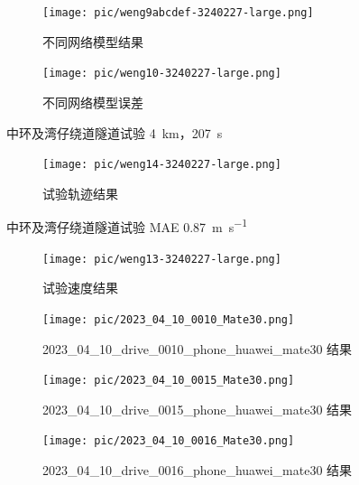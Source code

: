 \documentclass{beamer} %
\begin{document}
\begin{frame}
    \begin{figure}[htbp]
        \centering
        \texttt{[image: pic/weng9abcdef-3240227-large.png]}
        \caption{不同网络模型结果}
    \end{figure}    
\end{frame}

\begin{frame}
    \begin{figure}[htbp]
        \centering
        \texttt{[image: pic/weng10-3240227-large.png]}
        \caption{不同网络模型误差}
    \end{figure}    
\end{frame}

\begin{frame}{中环及湾仔绕道隧道试验}
    \qty{4}{\km}，\qty{207}{\s}
    \begin{figure}[htbp]
        \centering
        \texttt{[image: pic/weng14-3240227-large.png]}
        \caption{试验轨迹结果}
    \end{figure}    
\end{frame}

\begin{frame}{中环及湾仔绕道隧道试验}
    MAE \qty{0.87}{\m\per\s}
    \begin{figure}[htbp]
        \centering
        \texttt{[image: pic/weng13-3240227-large.png]}
        \caption{试验速度结果}
    \end{figure}    
\end{frame}

\begin{frame}
    \begin{figure}[htbp]
        \centering
        \texttt{[image: pic/2023\_04\_10\_0010\_Mate30.png]}
        \caption{2023\_04\_10\_drive\_0010\_phone\_huawei\_mate30 结果}
    \end{figure}
\end{frame}

\begin{frame}
    \begin{figure}[htbp]
        \centering
        \texttt{[image: pic/2023\_04\_10\_0015\_Mate30.png]}
        \caption{2023\_04\_10\_drive\_0015\_phone\_huawei\_mate30 结果}
    \end{figure}
\end{frame}

\begin{frame}
    \begin{figure}[htbp]
        \centering
        \texttt{[image: pic/2023\_04\_10\_0016\_Mate30.png]}
        \caption{2023\_04\_10\_drive\_0016\_phone\_huawei\_mate30 结果}
    \end{figure}
\end{frame}
\end{document}
